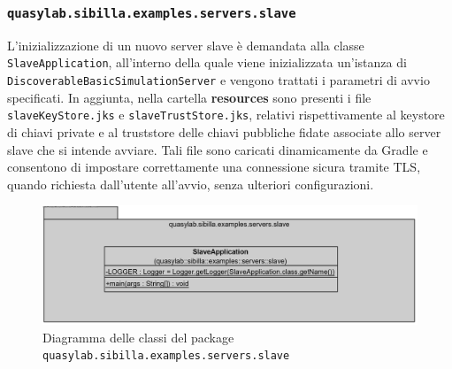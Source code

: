\subsubsection{\texttt{quasylab.sibilla.examples.servers.slave}}

L'inizializzazione di un nuovo server slave è demandata alla classe \texttt{SlaveApplication}, all'interno della quale viene inizializzata un'istanza di \texttt{DiscoverableBasicSimulationServer} e vengono trattati i parametri di avvio specificati.
In aggiunta, nella cartella \textbf{resources} sono presenti i file \texttt{slaveKeyStore.jks} e \texttt{slaveTrustStore.jks}, relativi rispettivamente al keystore di chiavi private e al truststore delle chiavi pubbliche fidate associate allo server slave che si intende avviare. Tali file sono caricati dinamicamente da Gradle e consentono di impostare correttamente una connessione sicura tramite TLS, quando richiesta dall'utente all'avvio, senza ulteriori configurazioni.

\begin{figure}[H]
    \includegraphics[width=\linewidth]{images/quasylab.sibilla.examples.servers.slave.png}
    \captionsetup{justification=centering}
    \caption{Diagramma delle classi del package \texttt{quasylab.sibilla.examples.servers.slave}}
  \end{figure}

